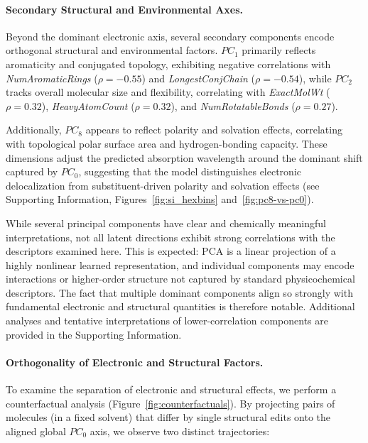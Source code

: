 \paragraph{Secondary Structural and Environmental Axes.}
Beyond the dominant electronic axis, several secondary components encode orthogonal structural and environmental factors. $PC_1$ primarily reflects aromaticity and conjugated topology, exhibiting negative correlations with \textit{NumAromaticRings} ($\rho = -0.55$) and \textit{LongestConjChain} ($\rho = -0.54$), while $PC_2$ tracks overall molecular size and flexibility, correlating with \textit{ExactMolWt} ($\rho = 0.32$), \textit{HeavyAtomCount} ($\rho = 0.32$), and \textit{NumRotatableBonds} ($\rho = 0.27$). 

Additionally, $PC_8$ appears to reflect polarity and solvation effects, correlating with topological polar surface area and hydrogen-bonding capacity. These dimensions adjust the predicted absorption wavelength around the dominant shift captured by $PC_0$, suggesting that the model distinguishes electronic delocalization from substituent-driven polarity and solvation effects (see Supporting Information, Figures~\ref{fig:si_hexbins} and~\ref{fig:pc8-vs-pc0}).

While several principal components have clear and chemically meaningful interpretations, not all latent directions exhibit strong correlations with the descriptors examined here. This is expected: PCA is a linear projection of a highly nonlinear learned representation, and individual components may encode interactions or higher-order structure not captured by standard physicochemical descriptors. The fact that multiple dominant components align so strongly with fundamental electronic and structural quantities is therefore notable. Additional analyses and tentative interpretations of lower-correlation components are provided in the Supporting Information.


\paragraph{Orthogonality of Electronic and Structural Factors.}
To examine the separation of electronic and structural effects, we perform a counterfactual analysis (Figure~\ref{fig:counterfactuals}). By projecting pairs of molecules (in a fixed solvent) that differ by single structural edits onto the aligned global $PC_0$ axis, we observe two distinct trajectories:

